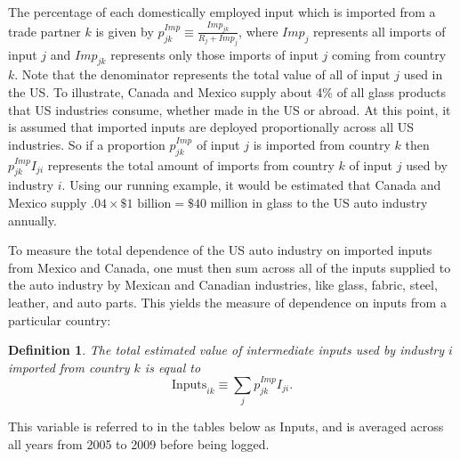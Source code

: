 \documentclass[hidelinks,12pt,letter]{article}
\newtheorem{defi}{Definition}
\begin{document}
The percentage of each domestically employed input which is imported from a trade partner $k$ is given by $p^{Imp}_{jk} \equiv \frac{Imp_{jk}}{R_j + Imp_j}$, where $Imp_j$ represents all imports of input $j$ and $Imp_{jk}$ represents only those imports of input $j$ coming from country $k$. Note that the denominator represents the total value of all of input $j$ used in the US. To illustrate, Canada and Mexico supply about 4\% of all glass products that US industries consume, whether made in the US or abroad. At this point, it is assumed that imported inputs are deployed proportionally across all US industries. So if a proportion $p^{Imp}_{jk}$ of input $j$ is imported from country $k$ then $p^{Imp}_{jk}I_{ji}$ represents the total amount of imports from country $k$ of input $j$ used by industry $i$. Using our running example, it would be estimated that Canada and Mexico supply $.04\times \$1 \text{ billion} = \$40$ million in glass to the US auto industry annually. 

To measure the total dependence of the US auto industry on imported inputs from Mexico and Canada, one must then sum across all of the inputs supplied to the auto industry by Mexican and Canadian industries, like glass, fabric, steel, leather, and auto parts. This yields the measure of dependence on inputs from a particular country:
\begin{defi}
The total estimated value of intermediate inputs used by industry $i$ imported from country $k$ is equal to $$ \mathrm{Inputs}_{ik} \equiv \sum\limits_j p^{Imp}_{jk}I_{ji}.$$ 
\end{defi}   
\noindent This variable is referred to in the tables below as Inputs, and is averaged across all years from 2005 to 2009 before being logged. %
\end{document}
